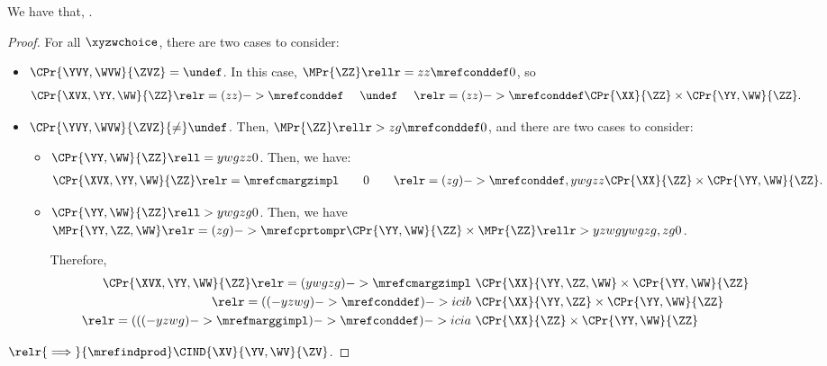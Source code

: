 \begin{proposition}
  We have that, \indcontrdefa.%
\end{proposition}

\begin{proof}
  For all $\xyzwchoice$, there are two cases to consider:
  \begin{itemize}
    \item {} $\CPr{\YVY, \WVW}{\ZVZ} = \undef$. In this case, $\MPr{\ZZ} \rellr = zz {\mrefconddef} 0$, so
      \begin{align*}
        \CPr{\XVX, \YY, \WW}{\ZZ} \relr = {(zz)->\mrefconddef} \ \ \ \ \undef\ \ \ \  
        \relr = {(zz)->\mrefconddef} \CPr{\XX}{\ZZ}\times \CPr{\YY, \WW}{\ZZ}.
      \end{align*}
    \item {} $\CPr{\YVY, \WVW}{\ZVZ} {\ne} \undef$. Then, $\MPr{\ZZ} \rellr > zg {\mrefconddef} 0$, and there are two cases to consider:
      \begin{itemize}
        \item {} $\CPr{\YY, \WW}{\ZZ} \rell = ywgzz 0$. Then, we have:
        \begin{align*}
          \CPr{\XVX, \YY, \WW}{\ZZ} \relr = {\mrefcmargzimpl} \ \ \ \ \ \ 0 \ \ \ \ \ \ 
          \relr = {(zg)->\mrefconddef,ywgzz} \CPr{\XX}{\ZZ}\times \CPr{\YY, \WW}{\ZZ}.
        \end{align*}
      \item \nrp 6 $\CPr{\YY, \WW}{\ZZ} \rell > ywgzg 0$.
        Then, we have $\MPr{\YY, \ZZ, \WW}  \relr = {(zg)->\mrefcprtompr} \CPr{\YY, \WW}{\ZZ} \times \MPr{\ZZ} \rellr > yzwg {ywgzg,zg} 0$.

        \nrp 7
        Therefore,
        \begin{align*}
          \CPr{\XVX, \YY, \WW}{\ZZ} \relr = {(ywgzg)->\mrefcmargzimpl} &\ \CPr{\XX}{\YY, \ZZ, \WW} \times \CPr{\YY, \WW}{\ZZ}\\
          \relr = {((-yzwg)->\mrefconddef)->icib} &\ \CPr{\XX}{\YY, \ZZ} \times \CPr{\YY, \WW}{\ZZ}\\
          \relr = {(((-yzwg)->\mrefmarggimpl)->\mrefconddef)->icia} &\ \CPr{\XX}{\ZZ} \times \CPr{\YY, \WW}{\ZZ}
        \end{align*}
      \end{itemize}
  \end{itemize}
  $\relr {\implies} {\mrefindprod} \CIND{\XV}{\YV, \WV}{\ZV}$.
\end{proof}

